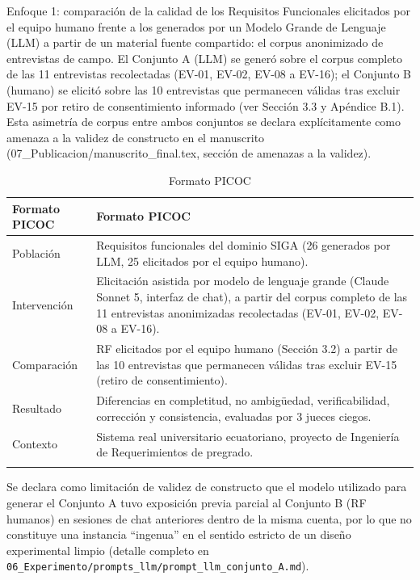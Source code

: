 
Enfoque 1: comparación de la calidad de los Requisitos Funcionales elicitados por el equipo humano frente a los generados por un Modelo Grande de Lenguaje (LLM) a partir de un material fuente compartido: el corpus anonimizado de entrevistas de campo. El Conjunto A (LLM) se generó sobre el corpus completo de las 11 entrevistas recolectadas (EV-01, EV-02, EV-08 a EV-16); el Conjunto B (humano) se elicitó sobre las 10 entrevistas que permanecen válidas tras excluir EV-15 por retiro de consentimiento informado (ver Sección 3.3 y Apéndice B.1). Esta asimetría de corpus entre ambos conjuntos se declara explícitamente como amenaza a la validez de constructo en el manuscrito (07\_Publicacion/manuscrito\_final.tex, sección de amenazas a la validez).


\begingroup
\small
\begin{longtable}{|P{0.5000}|P{0.5000}|}
\hline
Formato PICOC & Formato PICOC \\ \hline
Población & Requisitos funcionales del dominio SIGA (26 generados por LLM, 25 elicitados por el equipo humano). \\ \hline
Intervención & Elicitación asistida por modelo de lenguaje grande (Claude Sonnet 5, interfaz de chat), a partir del corpus completo de las 11 entrevistas anonimizadas recolectadas (EV-01, EV-02, EV-08 a EV-16). \\ \hline
Comparación & RF elicitados por el equipo humano (Sección 3.2) a partir de las 10 entrevistas que permanecen válidas tras excluir EV-15 (retiro de consentimiento). \\ \hline
Resultado & Diferencias en completitud, no ambigüedad, verificabilidad, corrección y consistencia, evaluadas por 3 jueces ciegos. \\ \hline
Contexto & Sistema real universitario ecuatoriano, proyecto de Ingeniería de Requerimientos de pregrado. \\ \hline
\caption{Formato PICOC}
\end{longtable}
\endgroup

Se declara como limitación de validez de constructo que el modelo utilizado para generar el Conjunto A tuvo exposición previa parcial al Conjunto B (RF humanos) en sesiones de chat anteriores dentro de la misma cuenta, por lo que no constituye una instancia ``ingenua'' en el sentido estricto de un diseño experimental limpio (detalle completo en \nolinkurl{06_Experimento/prompts_llm/prompt_llm_conjunto_A.md}).

